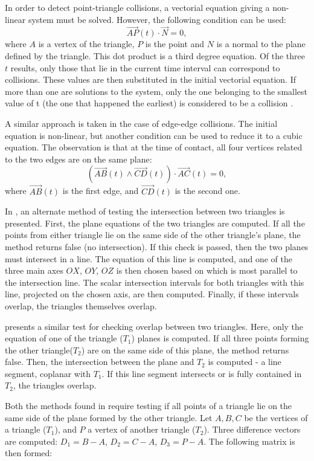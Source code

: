 In order to detect point-triangle collisions, a vectorial equation giving a non-linear system must be solved. However, the following condition can be used: \[\overrightarrow{AP}(t) \cdot \overrightarrow{N} = 0,\] where $A$ is a vertex of the triangle, $P$ is the point and $N$ is a normal to the plane defined by the triangle. This dot product is a third degree equation. Of the three $t$ results, only those that lie in the current time interval can correspond to collisions. These values are then substituted in the initial vectorial equation. If more than one are solutions to the system, only the one belonging to the smallest value of t (the one that happened the earliest) is considered to be a collision \citep{provot97}.

A similar approach is taken in the case of edge-edge collisions. The initial equation is non-linear, but another condition can be used to reduce it to a cubic equation. The observation is that at the time of contact, all four vertices related to the two edges are on the same plane: \[(\overrightarrow{AB}(t) \wedge \overrightarrow{CD}(t)) \cdot \overrightarrow{AC}(t) = 0,\] where $\overrightarrow{AB}(t)$ is the first edge, and $\overrightarrow{CD}(t)$ is the second one.

In \citep{moller97}, an alternate method of testing the intersection between two triangles is presented. First, the plane equations of the two triangles are computed. If all the points from either triangle lie on the same side of the other triangle's plane, the method returns false (no intersection). If this check is passed, then the two planes must intersect in a line. The equation of this line is computed, and one of the three main axes $OX$, $OY$, $OZ$ is then chosen based on which is most parallel to the intersection line. The scalar intersection intervals for both triangles with this line, projected on the chosen axis, are then computed. Finally, if these intervals overlap, the triangles themselves overlap.

\citep{held97} presents a similar test for checking overlap between two triangles. Here, only the equation of one of the triangle ($T_{1}$) planes is computed. If all three points forming the other triangle($T_{2}$) are on the same side of this plane, the method returns false. Then, the intersection between the plane and $T_{2}$ is computed - a line segment, coplanar with $T_{1}$. If this line segment intersects or is fully contained in $T_{2}$, the triangles overlap.

Both the methods found in \citep{moller97, held97} require testing if all points of a triangle lie on the same side of the plane formed by the other triangle. Let $A, B, C$ be the vertices of a triangle ($T_{1}$), and $P$ a vertex of another triangle ($T_{2}$). Three difference vectors are computed: $D_{1} = B - A$, $D_{2} = C - A$, $D_{3} = P - A$. The following matrix is then formed:


